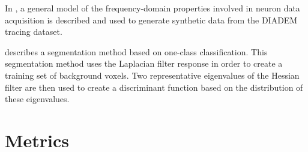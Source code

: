 \documentclass[12pt]{article}
\begin{document}
\begin{enumerate}[label={}]
			In \autocite{Hernandez-Herrera2013}, a
			general model of the frequency-domain
			properties involved in neuron data
			acquisition is described and used to
			generate synthetic data from the DIADEM
			tracing dataset.

			\Autocite{Hernandez-Herrera2014} describes
			a segmentation method based on one-class
			classification. This segmentation method
			uses the Laplacian filter response in
			order to create a training set of
			background voxels. Two representative
			eigenvalues of the Hessian filter are then
			used to create a discriminant function
			based on the distribution of these
			eigenvalues.

\end{enumerate}


\section{Metrics}
\end{document}
